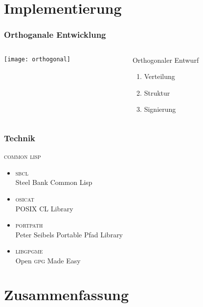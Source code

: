 \documentclass[german]{beamer}
\newcommand{\GPG}{\textsc{gpg}}
\newcommand{\SBCL}{\textsc{sbcl}}
\newcommand{\COMMONLISP}{\textsc{common lisp}}
\newcommand{\LIBGPGME}{\textsc{libgpgme}}
\newcommand{\OSICAT}{\textsc{osicat}}
\newcommand{\PORTPATH}{\textsc{portpath}}
\begin{document}
\section{Implementierung}

\begin{frame}
  \frametitle{Orthoganale Entwicklung}
  \begin{columns}[c]
    \begin{column}{5cm}
      \texttt{[image: orthogonal]}
    \end{column}
    \begin{column}{7cm}
      \begin{block}{Orthogonaler Entwurf}
        \begin{enumerate}
        \item Verteilung 
        \item Struktur
        \item Signierung
        \end{enumerate}
      \end{block}

    \end{column}
  \end{columns}
\end{frame}

\begin{frame}
  \frametitle{Technik}
  \begin{block}{\COMMONLISP}
    \begin{itemize}
    \item \SBCL\\
      Steel Bank Common Lisp
    \item \OSICAT\\
      POSIX CL Library
    \item \PORTPATH\\
      Peter Seibels Portable Pfad Library
      \pause
    \item \LIBGPGME\\
      Open \GPG{} Made Easy
    \end{itemize}
  \end{block}
\end{frame}

\section{Zusammenfassung}
\end{document}
